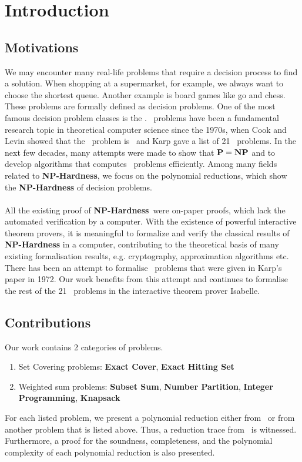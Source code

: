 
\newcommand{\XC}{\textbf{Exact Cover}}
\newcommand{\HS}{\textbf{Exact Hitting Set}}
\newcommand{\SBS}{\textbf{Subset Sum}}
\newcommand{\Part}{\textbf{Number Partition}}
\newcommand{\IP}{\textbf{Integer Programming}}
\newcommand{\KN}{\textbf{Knapsack}}


\chapter{Introduction}\label{chapter:introduction}
\section{Motivations}
We may encounter many real-life problems that require a decision process to find a solution. 
When shopping at a supermarket, for example, we always want to choose the shortest queue. 
Another example is board games like go and chess. These problems are formally defined as decision problems.
One of the most famous decision problem classes is the \NPH.
\NPH\ problems have been a fundamental research topic in theoretical computer science since the 1970s, when Cook and Levin showed that the \SAT\ problem is \NPC\ and Karp gave a list of 21 \NPH\ problems. In the next few decades, many attempts were made to show that $\textbf{P} = \textbf{NP}$ and to develop algorithms that computes \NP\ problems efficiently. Among many fields related to \textbf{NP-Hardness}, we focus on the polynomial reductions, which show the \textbf{NP-Hardness} of decision problems. \\\\
All the existing proof of \textbf{NP-Hardness}\ were on-paper proofs, which lack the automated verification by a computer. With the existence of powerful interactive theorem provers, it is meaningful to formalize and verify the classical results of \textbf{NP-Hardness} in a computer, contributing to the theoretical basis of many existing formalisation results, e.g. cryptography, approximation algorithms etc. There has been an attempt to formalise \NPH\ problems that were given in Karp's paper in 1972. Our work benefits from this attempt and continues to formalise the rest of the 21 \NPH\ problems in the interactive theorem prover Isabelle. 

\section{Contributions}
Our work contains 2 categories of problems. 
\begin{enumerate}
    \item Set Covering problems: \XC, \HS
    \item Weighted sum problems: \SBS, \Part, \IP, \KN
\end{enumerate}
For each listed problem, we present a polynomial reduction either from \SAT\ or from another problem that is listed above. Thus, a reduction trace from \SAT\ is witnessed. Furthermore, a proof for the soundness, completeness, and the polynomial complexity of each polynomial reduction is also presented. 

